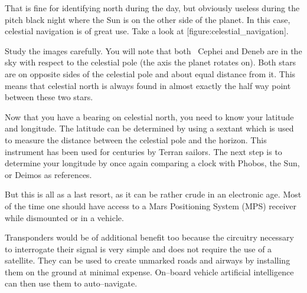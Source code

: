 That is fine for identifying north during the day, but obviously useless during the pitch black night where the Sun is on the other side of the planet. In this case, celestial navigation is of great use. Take a look at [figure:celestial_navigation].

    {}
    {}
    {}
    \stopcombination

Study the images carefully. You will note that both \alpha\ Cephei and Deneb are  in the sky with respect to the celestial pole (the axis the planet rotates on). Both stars are on opposite sides of the celestial pole and about equal distance from it. This means that celestial north is always found in almost exactly the half way point between these two stars.

Now that you have a bearing on celestial north, you need to know your latitude and longitude. The latitude can be determined by using a sextant which is used to measure the distance between the celestial pole and the horizon. This instrument has been used for centuries by Terran sailors. The next step is to determine your longitude by once again comparing a clock with Phobos, the Sun, or Deimos as references.

But this is all as a last resort, as it can be rather crude in an electronic age. Most of the time one should have access to a Mars Positioning System (MPS) receiver while dismounted or in a vehicle. 

Transponders would be of additional benefit too because the circuitry necessary to interrogate their signal is very simple and does not require the use of a satellite. They can be used to create unmarked roads and airways by installing them on the ground at minimal expense. On--board vehicle artificial intelligence can then use them to auto--navigate.

